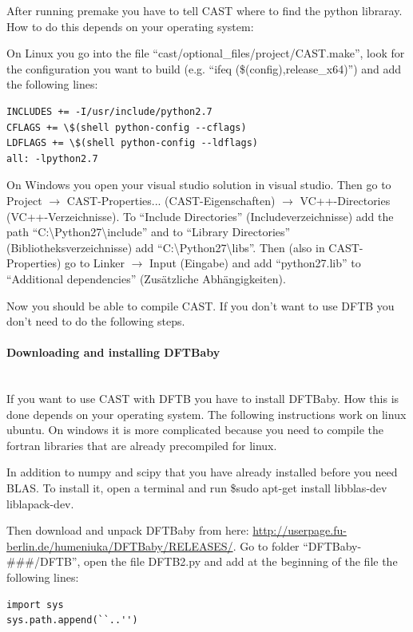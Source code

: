 \documentclass[10pt,a4paper]{article} %
\begin{document}
After running premake you have to tell CAST where to find the python libraray. How to do this depends on your operating system:

On Linux you go into the file ``cast/optional\_files/project/CAST.make'', look for the configuration you want to build (e.g. ``ifeq (\$(config),release\_x64)'') and add the following lines:
\begin{lstlisting}
INCLUDES += -I/usr/include/python2.7
CFLAGS += \$(shell python-config --cflags)
LDFLAGS += \$(shell python-config --ldflags)
all: -lpython2.7
\end{lstlisting}

On Windows you open your visual studio solution in visual studio. Then go to Project $\rightarrow$ CAST-Properties... (CAST-Eigenschaften) $\rightarrow$ VC++-Directories (VC++-Verzeichnisse). To ``Include Directories'' (Includeverzeichnisse) add the path ``C:\textbackslash Python27\textbackslash include'' and to ``Library Directories'' (Bibliotheksverzeichnisse) add ``C:\textbackslash Python27\textbackslash libs''. Then (also in CAST-Properties) go to Linker $\rightarrow$ Input (Eingabe) and add ``python27.lib'' to ``Additional dependencies'' (Zusätzliche Abhängigkeiten).

Now you should be able to compile CAST. If you don't want to use DFTB you don't need to do the following steps.

\paragraph{Downloading and installing DFTBaby}\mbox{}\\

If you want to use CAST with DFTB you have to install DFTBaby. How this is done depends on your operating system. The following instructions work on linux ubuntu. On windows it is more complicated because you need to compile the fortran libraries that are already precompiled for linux.

In addition to numpy and scipy that you have already installed before you need BLAS. To install it, open a terminal and run \$sudo apt-get install libblas-dev liblapack-dev.

Then download and unpack DFTBaby from here: \url{http://userpage.fu-berlin.de/humeniuka/DFTBaby/RELEASES/}. Go to folder ``DFTBaby-\#\#\#/DFTB'', open the file DFTB2.py and add at the beginning of the file the following lines:
\begin{lstlisting}
import sys
sys.path.append(``..'')
\end{lstlisting}
\end{document}
